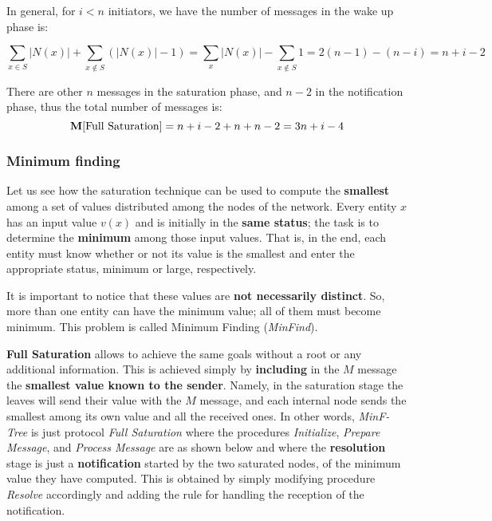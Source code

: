 In general, for $i<n$ initiators, we have the number of messages in the wake up phase is:

$$\sum_{x \in S} |N(x)| + \sum_{x \notin S} (|N(x)| - 1) = \sum_x |N(x)| - \sum_{x \notin S} 1 = 2(n-1) - (n-i) = n+i-2 $$

There are other $n$ messages in the saturation phase, and $n-2$ in the notification phase, thus the total number of messages is:
$$
\mathbf{M}[\text{Full Saturation}] = n+i-2+n+n-2 = 3n+i-4
$$

\subsubsection{Minimum finding}
Let us see how the saturation technique can be used to compute the \textbf{smallest} among a set of values distributed among the nodes of the network. Every entity $x$ has an input value $v(x)$ and is initially in the \textbf{same status}; the task is to determine the \textbf{minimum} among those input values. That is, in the end, each entity must know whether or not its value is the smallest and enter the appropriate status, minimum or large, respectively.

It is important to notice that these values are \textbf{not necessarily distinct}. So, more than one entity can have the minimum value; all of them must become minimum. This problem is called Minimum Finding (\textit{MinFind}). 

\textbf{Full Saturation} allows to achieve the same goals without a root or any additional information. This is achieved simply by \textbf{including} in the $M$ message the \textbf{smallest value known to the sender}. Namely, in the saturation stage the leaves will send their value with the $M$ message, and each internal node sends the smallest among its own value and all the received ones. In other words, \textit{MinF-Tree} is just protocol \textit{Full Saturation} where the procedures \textit{Initialize}, \textit{Prepare Message}, and \textit{Process Message} are as shown below and where the \textbf{resolution} stage is just a \textbf{notification} started by the two saturated nodes, of the minimum value they have computed. This is obtained by simply modifying procedure \textit{Resolve} accordingly and adding the rule for handling the reception of the notification.



